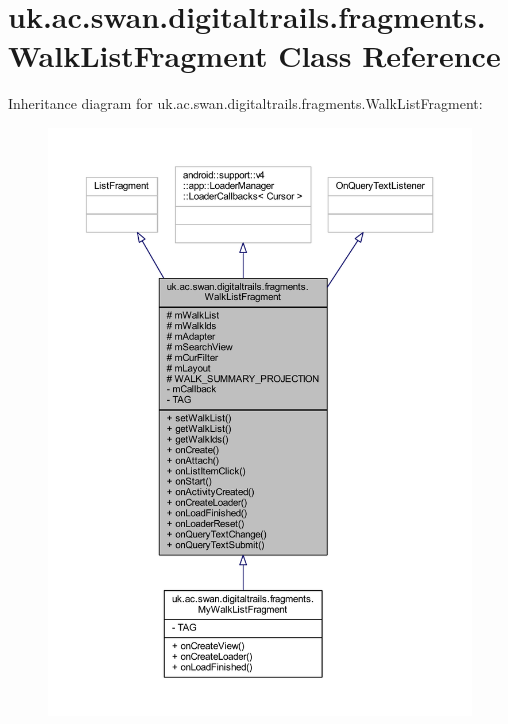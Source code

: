 \hypertarget{classuk_1_1ac_1_1swan_1_1digitaltrails_1_1fragments_1_1_walk_list_fragment}{\section{uk.\+ac.\+swan.\+digitaltrails.\+fragments.\+Walk\+List\+Fragment Class Reference}
\label{classuk_1_1ac_1_1swan_1_1digitaltrails_1_1fragments_1_1_walk_list_fragment}
}


Inheritance diagram for uk.\+ac.\+swan.\+digitaltrails.\+fragments.\+Walk\+List\+Fragment\+:
\nopagebreak
\begin{figure}[H]
\begin{center}
\leavevmode
\includegraphics[width=350pt]{classuk_1_1ac_1_1swan_1_1digitaltrails_1_1fragments_1_1_walk_list_fragment__inherit__graph}
\end{center}
\end{figure}


